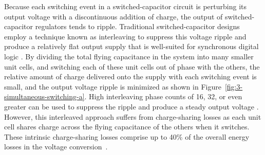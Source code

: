 \documentclass[graybox]{svmult}
\begin{document}
Because each switching event in a switched-capacitor circuit is perturbing its output voltage with a discontinuous addition of charge, the output of switched-capacitor regulators tends to ripple.
Traditional switched-capacitor designs employ a technique known as interleaving to suppress this voltage ripple and produce a relatively flat output supply that is well-suited for synchronous digital logic \cite{Clerc2015, Jain2014, Jiang2017, Kim2015, Song2015, Teh2016}.
By dividing the total flying capacitance in the system into many smaller unit cells, and switching each of these unit cells out of phase with the others, the relative amount of charge delivered onto the supply with each switching event is small, and the output voltage ripple is minimized as shown in Figure~\ref{fig:3-simultaneous-switching-a}.
High interleaving phase counts of 16, 32, or even greater can be used to suppress the ripple and produce a steady output voltage \cite{Andersen2014, Le2011, Pique2012}.
However, this interleaved approach suffers from charge-sharing losses as each unit cell shares charge across the flying capacitance of the others when it switches.
These intrinsic charge-sharing losses comprise up to 40\% of the overall energy losses in the voltage conversion~\cite{Jevtic2014}.
\end{document}
